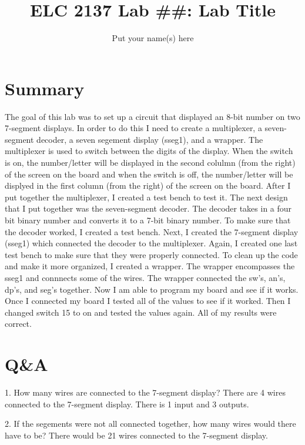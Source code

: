 \documentclass[11pt]{article}
\begin{document}
\title{ELC 2137 Lab \#\#: Lab Title}
\author{Put your name(s) here}

\maketitle


\section*{Summary}

The goal of this lab was to set up a circuit that displayed an 8-bit number on two 7-segment displays. In order to do this I need to create a multiplexer, a seven-segment decoder, a seven segement display (sseg1), and a wrapper. The multiplexer is used to switch between the digits of the display. When the switch is on, the number/letter will be displayed in the second colulmn (from the right) of the screen on the board and when the switch is off, the number/letter will be displyed in the first column (from the right) of the screen on the board. After I put together the multiplexer, I created a test bench to test it. The next design that I put together was the seven-segment decoder. The decoder takes in a four bit binary number and converts it to a 7-bit binary number. To make sure that the decoder worked, I created a test bench. Next, I created the 7-segment display (sseg1) which connected the decoder to the multiplexer. Again, I created one last test bench to make sure that they were properly connected. To clean up the code and make it more organized, I created a wrapper. The wrapper encompasses the sseg1 and connnects some of the wires. The wrapper connected the sw's, an's, dp's, and seg's together. Now I am able to program my board and see if it works. Once I connected my board I tested all of the values to see if it worked. Then I changed switch 15 to on and tested the values again. All of my results were correct. 


\section*{Q\&A}

1. How many wires are connected to the 7-segment display? \newline
There are 4 wires connected to the 7-segment display. There is 1 input and 3 outputs. \newline


2. If the segements were not all connected together, how many wires would there have to be? \newline
There would be 21 wires connected to the 7-segment display. \newline
\end{document}
